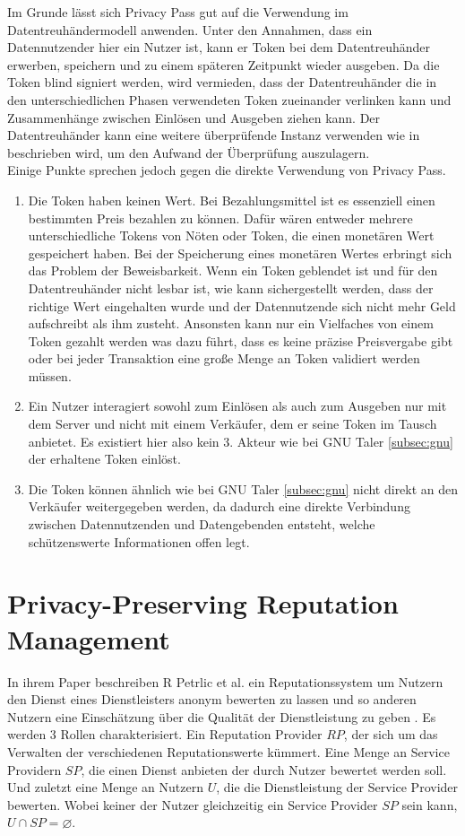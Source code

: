 \documentclass{scrreprt}
\begin{document}
Im Grunde lässt sich Privacy Pass gut auf die Verwendung im Datentreuhändermodell anwenden. Unter den Annahmen, dass ein Datennutzender hier ein Nutzer ist, kann er Token bei dem Datentreuhänder erwerben, speichern und zu einem späteren Zeitpunkt wieder ausgeben. Da die Token blind signiert werden, wird vermieden, dass der Datentreuhänder die in den unterschiedlichen Phasen verwendeten Token zueinander verlinken kann und Zusammenhänge zwischen Einlösen und Ausgeben ziehen kann. Der Datentreuhänder kann eine weitere überprüfende Instanz verwenden wie in \cite{pp-davidson2018privacy} beschrieben wird, um den Aufwand der Überprüfung auszulagern. \\
Einige Punkte sprechen jedoch gegen die direkte Verwendung von Privacy Pass. 
\begin{enumerate}
    \item Die Token haben keinen Wert. Bei Bezahlungsmittel ist es essenziell einen bestimmten Preis bezahlen zu können. Dafür wären entweder mehrere unterschiedliche Tokens von Nöten oder Token, die einen monetären Wert gespeichert haben. Bei der Speicherung eines monetären Wertes erbringt sich das Problem der Beweisbarkeit. Wenn ein Token geblendet ist und für den Datentreuhänder nicht lesbar ist, wie kann sichergestellt werden, dass der richtige Wert eingehalten wurde und der Datennutzende sich nicht mehr Geld aufschreibt als ihm zusteht. Ansonsten kann nur ein Vielfaches von einem Token gezahlt werden was dazu führt, dass es keine präzise Preisvergabe gibt oder bei jeder Transaktion eine große Menge an Token validiert werden müssen.
    \item Ein Nutzer interagiert sowohl zum Einlösen als auch zum Ausgeben nur mit dem Server und nicht mit einem Verkäufer, dem er seine Token im Tausch anbietet. Es existiert hier also kein 3. Akteur wie bei GNU Taler \ref{subsec:gnu} der erhaltene Token einlöst.
    \item Die Token können ähnlich wie bei GNU Taler \ref{subsec:gnu} nicht direkt an den Verkäufer weitergegeben werden, da dadurch eine direkte Verbindung zwischen Datennutzenden und Datengebenden entsteht, welche schützenswerte Informationen offen legt.
\end{enumerate}

\section{Privacy-Preserving Reputation Management}
\label{subsec:rep}
In ihrem Paper beschreiben R Petrlic et al. ein Reputationssystem um Nutzern den Dienst eines Dienstleisters anonym bewerten zu lassen und so anderen Nutzern eine Einschätzung über die Qualität der Dienstleistung zu geben \cite{petrlic2014privacy}. Es werden 3 Rollen charakterisiert. Ein Reputation Provider $RP$, der sich um das Verwalten der verschiedenen Reputationswerte kümmert. Eine Menge an Service Providern $SP$, die einen Dienst anbieten der durch Nutzer bewertet werden soll. Und zuletzt eine Menge an Nutzern $U$, die die Dienstleistung der Service Provider bewerten. Wobei keiner der Nutzer gleichzeitig ein Service Provider $SP$ sein kann, $U \cap SP = \varnothing$. 
\end{document}
